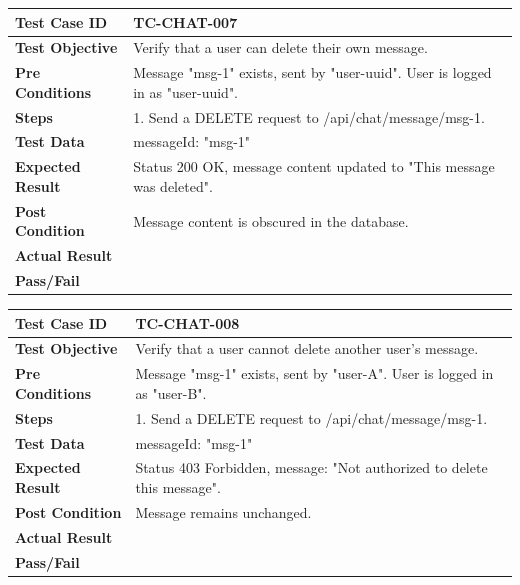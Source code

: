 \begin{longtable}{|p{}|p{}|}
\hline
\textbf{Test Case ID} & TC-CHAT-007 \\ \hline
\textbf{Test Objective} & Verify that a user can delete their own message. \\ \hline
\textbf{Pre Conditions} & Message "msg-1" exists, sent by "user-uuid". User is logged in as "user-uuid". \\ \hline
\textbf{Steps} & 
1. Send a DELETE request to /api/chat/message/msg-1. \\ \hline
\textbf{Test Data} & messageId: "msg-1" \\ \hline
\textbf{Expected Result} & Status 200 OK, message content updated to "This message was deleted". \\ \hline
\textbf{Post Condition} & Message content is obscured in the database. \\ \hline
\textbf{Actual Result} &  \\ \hline
\textbf{Pass/Fail} &  \\ \hline
\end{longtable}

\begin{longtable}{|p{}|p{}|}
\hline
\textbf{Test Case ID} & TC-CHAT-008 \\ \hline
\textbf{Test Objective} & Verify that a user cannot delete another user's message. \\ \hline
\textbf{Pre Conditions} & Message "msg-1" exists, sent by "user-A". User is logged in as "user-B". \\ \hline
\textbf{Steps} & 
1. Send a DELETE request to /api/chat/message/msg-1. \\ \hline
\textbf{Test Data} & messageId: "msg-1" \\ \hline
\textbf{Expected Result} & Status 403 Forbidden, message: "Not authorized to delete this message". \\ \hline
\textbf{Post Condition} & Message remains unchanged. \\ \hline
\textbf{Actual Result} &  \\ \hline
\textbf{Pass/Fail} &  \\ \hline
\end{longtable}

